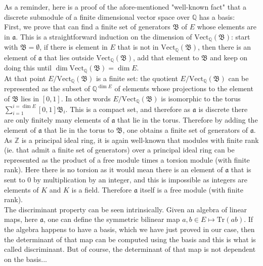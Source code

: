 \documentclass[12pt]{article}
\begin{document}
As a reminder, here is a proof of the afore-mentioned "well-known fact" that a discrete submodule of a finite dimensional vector space over $\mathbb Q$ has a basis:\\
First, we prove that can find a finite set of generators $\mathfrak B$ of $E$ whose elements are in $\mathfrak a$. 
This is a straightforward induction on the dimension of $\mathrm{Vect}_{\mathbb Q}({\mathfrak B})$: start with ${\mathfrak B}=\emptyset$, if there is element in $E$ that is not in $\mathrm{Vect}_{\mathbb Q}({\mathfrak B})$, then there is an element of $\mathfrak a$ that lies outside $\mathrm{Vect}_{\mathbb Q}({\mathfrak B})$, add that element to $\mathfrak B$ and keep on doing this until $\dim \mathrm{Vect}_{\mathbb Q}({\mathfrak B})=\dim E$.\\
 At that point $E/\mathrm{Vect}_{\mathbb Q}({\mathfrak B})$ is a finite set: the quotient $E/\mathrm{Vect}_{\mathbb Q}({\mathfrak B})$ can be represented as the subset of ${\mathbb Q}^{\dim E}$ of elements whose projections to the element of $\mathfrak B$ lies in $[0,1]$.
 In other words $E/\mathrm{Vect}_{\mathbb Q}({\mathfrak B})$ is isomorphic to the torus $\sum_{i=1}^{i=\dim E} [0,1]{\mathfrak B}_i$. This is a compact set, and therefore as $\mathfrak a$ is discrete there are only finitely many elements of $\mathfrak a$ that lie in the torus. Therefore by adding the element of $\mathfrak a$ that lie in the torus to $\mathfrak B$, one obtains a finite set of generators of $\mathfrak a$.\\
 As $\mathbb Z$ is a principal ideal ring, it is again well-known that modules with finite rank (ie. that admit a finite set of generators) over a principal ideal ring can be represented as the product of a free module times a torsion module (with finite rank). Here there is no torsion as it would mean there is an element of $\mathfrak a$ that is sent to $0$ by multiplication by an integer, and this is impossible as integers are elements of $K$ and $K$ is a field. Therefore $\mathfrak a$ itself is a free module (with finite rank).\\

The discriminant property can be seen intrinsically. Given an algebra of linear maps, here ${\mathfrak a}$, one can define the symmetric bilinear map $a,b\in E \mapsto \mathrm{Tr}(ab)$. If the algebra happens to have a basis, which we have just proved in our case, then the determinant of that map can be computed using the basis and this is what is called discriminant. But of course, the determinant of that map is not dependent on the basis...\\
\end{document}
